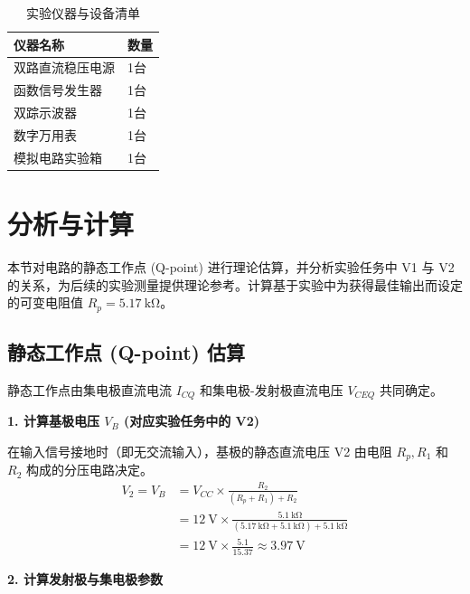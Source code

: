 \documentclass[UTF8]{ctexrep} %
\begin{document}
\begin{table}[H]
    \centering
    \caption{实验仪器与设备清单}
    \label{tab:instruments1}
    \begin{tabular}{ll}
        \toprule
        \textbf{仪器名称} & \textbf{数量} \\
        \midrule
        双路直流稳压电源 & 1台 \\
        函数信号发生器 & 1台 \\
        双踪示波器 & 1台 \\
        数字万用表 & 1台 \\
        模拟电路实验箱 & 1台 \\
        \bottomrule
    \end{tabular}
\end{table}


\section{分析与计算}
\label{sec:exp1_analysis}

本节对电路的静态工作点 (Q-point) 进行理论估算，并分析实验任务中 V1 与 V2 的关系，为后续的实验测量提供理论参考。计算基于实验中为获得最佳输出而设定的可变电阻值 $R_p = \SI{5.17}{\kilo\ohm}$。

\subsection{静态工作点 (Q-point) 估算}
静态工作点由集电极直流电流 $I_{CQ}$ 和集电极-发射极直流电压 $V_{CEQ}$ 共同确定。

\textbf{1. 计算基极电压 $V_B$ (对应实验任务中的 V2)}

在输入信号接地时（即无交流输入），基极的静态直流电压 V2 由电阻 $R_p, R_1$ 和 $R_2$ 构成的分压电路决定。
\begin{align}
    V_2 = V_B &= V_{CC} \times \frac{R_2}{(R_p + R_1) + R_2} \nonumber \\
        &= \SI{12}{\volt} \times \frac{\SI{5.1}{\kilo\ohm}}{(\SI{5.17}{\kilo\ohm} + \SI{5.1}{\kilo\ohm}) + \SI{5.1}{\kilo\ohm}} \nonumber \\
        &= \SI{12}{\volt} \times \frac{5.1}{15.37} \approx \SI{3.97}{\volt} \label{eq:V2_calc}
\end{align}

\textbf{2. 计算发射极与集电极参数}
\end{document}
